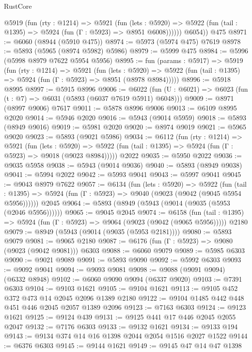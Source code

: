 \begin{lexlean}{RustCore}
\begin{coremodule}
          @5919
            (fun (rty : @1214) =>
            @5921
              (fun (lets : @5920) =>
              @5922 (fun (tail : @1395) => @5924 (fun (Γ : @5923) => @8951 @6008))))))
        @6054))
    @475
@8971 := @6060 (@8944 (@5910 @475))
@8974 := @5973 (@5974 @475) @7619
@8978 := @5893 (@5965 (@8974 @5982) @5986)
@8979 := @5999 @475
@8984 := @5996 (@5998 @8979 @7622 @5954 @5956)
@8995 := fun (params : @5917) =>
  @5919
    (fun (rty : @1214) =>
    @5921
      (fun (lets : @5920) =>
      @5922 (fun (tail : @1395) => @5924 (fun (Γ : @5923) => @8951 (@8978 @8984)))))
@8996 := @5918 @8995
@8997 := @5915 @8996
@9006 := @6022 (fun (U : @6021) => @6023 (fun (t : @7) => @6031 (@5893 (@6037 @7619 @5911) @6048)))
@9009 := @8971 (@8997 @9006) @7617
@9011 := @5878 @8996 @9006
@9013 := @6109 @8995 @2020
@9014 := @5946 @2020
@9016 := @5943 (@9014 @5959)
@9018 := @5893 (@8949 @9016)
@9019 := @5981 @2020
@9020 := @8974 @9019
@9021 := @5965 @9020
@9023 := @5893 (@9021 @5986)
@9034 := @6112
    (fun (rty : @1214) =>
    @5921
      (fun (lets : @5920) =>
      @5922 (fun (tail : @1395) => @5924 (fun (Γ : @5923) => @9018 (@9023 @8984)))))
    @2022
@9035 := @5950 @2022
@9036 := @9035 @5958
@9038 := @5943 (@9014 @9036)
@9040 := @5893 (@8949 @9038)
@9041 := @5994 @2022
@9042 := @5993 @9041
@9043 := @5997 @9041
@9045 := @9043 @8979 @7622
@9057 := @6134
    (fun (lets : @5920) =>
    @5922
      (fun (tail : @1395) => @5924 (fun (Γ : @5923) => @9040 (@9023 (@9042 (@9045 @5954 @5956))))))
    @2045
@9064 := @5893 (@8949 (@5943 (@9014 (@9035 (@5953 (@2046 @5956))))))
@9065 := @9045 @2045
@9074 := @6158
    (fun (tail : @1395) => @5924 (fun (Γ : @5923) => @9064 (@9023 (@9042 (@9065 @5956)))))
    @2180
@9079 := @8949 (@5943 (@9014 (@9035 (@5953 @2181))))
@9080 := @5893 @9079
@9081 := @9065 @2180
@9087 := @6176 (fun (Γ : @5923) => @9080 (@9023 (@9042 @9081))) @6303
@9088 := @6060 @9079
@9089 := @5985 @6303
@9090 := @9021 @9089
@9091 := @5893 @9090
@9092 := @5992 @6303
@9093 := @9092 @9041
@9094 := @9093 @9081
@9098 := @9088 (@9091 @9094) (@6332 @8948)
@9102 := @6060 @9090 @9094 (@6337 @9020)
@9103 := @7391 @6303
@9104 := @9103 @1621
@9105 := @9104 @1621
@9113 := @9105 @452 @372 @473 @14 @2045 @2096 @1389 @2180
@9122 := @9104 @1485 @442 @448 @451 @446 @2045 @2057 @1389 @2096
@9123 := @7163 @6303
@9124 := @9123 @1621
@9125 := @9124 @439
@9131 := @9125 @441 @17 @446 @2045 @2055 @2047
@9132 := @7176 @6303
@9133 := @9132 @1621
@9134 := @9133 @194
@9143 := @9134 @374 @14 @16 @1398 @2044 @2054 @1516 @2027 @1522
@9144 := @6376 @6303
@9145 := @9144 @1621
@9149 := @9145 @47 @14 @47 @1398

\end{coremodule}
\end{lexlean}
